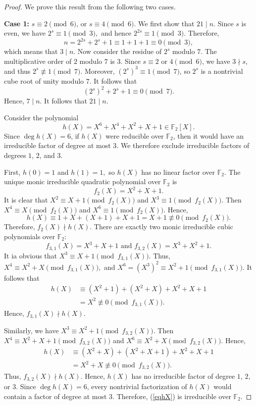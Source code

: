 \documentclass[12pt,draftcls,journal,onecolumn]{IEEEtran}
\begin{document}
\begin{proof}
We prove this result from the following two cases.

\noindent
\textbf{Case 1:} $s\equiv 2 \pmod 6$,
or
$s\equiv 4 \pmod 6$.  We first show that \(21\mid n\).
Since \(s\) is even, we have
$
2^s\equiv 1 \pmod 3,
$
and hence
$
2^{2s}\equiv 1 \pmod 3.
$
Therefore,
\[
n=2^{2s}+2^s+1\equiv 1+1+1\equiv 0 \pmod 3,
\]
which means that \(3\mid n\).
Now consider the residue of \(2^s\) modulo \(7\). The multiplicative order of \(2\) modulo \(7\) is \(3\). Since \(s\equiv 2\) or \(4\pmod 6\), we have \(3\nmid s\), and thus \(2^s\not\equiv 1\pmod 7\). Moreover, \((2^s)^3\equiv 1\pmod 7\), so \(2^s\) is a nontrivial cube root of unity modulo \(7\). It follows that
\[
(2^s)^2+2^s+1\equiv 0 \pmod 7.
\]
Hence, \(7\mid n\). It follows that
$
21\mid n.
$

Consider the polynomial
\begin{equation}\label{eqhX}
h(X)=X^6+X^4+X^2+X+1\in \mathbb F_2[X].
\end{equation}
Since \(\deg {h(X)}=6\), if \(h(X)\) were reducible over \(\mathbb F_2\), then it would have an irreducible factor of degree at most \(3\). We therefore exclude irreducible factors of degrees \(1\), \(2\), and \(3\).

First,
$h(0)=1$ and $h(1)=1,$
so \(h(X)\) has no linear factor over \(\mathbb F_2\).
The unique monic irreducible quadratic polynomial over \(\mathbb F_2\) is
$$
f_2(X)=X^2+X+1.
$$
It is clear that
$
X^2\equiv X+1 \pmod {f_2(X)}
$ and $
X^3\equiv1\pmod {f_2(X)}.
$
Then
$
X^4\equiv X \pmod {f_2(X)}
$ and
$X^6\equiv1 \pmod {f_2(X)}.
$
Hence,
$$
h(X)
\equiv
1+X+(X+1)+X+1
=
X+1
\not\equiv0
\pmod{f_2(X)}.
$$
Therefore, \(f_2(X)\nmid h(X)\).
There are exactly two monic irreducible cubic polynomials over \(\mathbb F_2\):
$$
f_{3,1}(X)=X^3+X+1\,\, \text{and}\,\,
f_{3,2}(X)=X^3+X^2+1.
$$
It ia obvious that
$
X^3\equiv X+1 \pmod {f_{3,1}(X)}.
$
Thus,
$
X^4\equiv X^2+X \pmod {f_{3,1}(X)},
$ and $
X^6=(X^3)^2\equiv X^2+1 \pmod {f_{3,1}(X)}.
$
It follows that
$$
\begin{aligned}
h(X)
&\equiv
(X^2+1)+(X^2+X)+X^2+X+1\\
&=X^2
\not\equiv0
\pmod{f_{3,1}(X)}.
\end{aligned}
$$
Hence, \(f_{3,1}(X)\nmid h(X)\).

Similarly, we have
$
X^3\equiv X^2+1 \pmod {f_{3,2}(X)}.
$
Then
$
X^4\equiv X^2+X+1 \pmod {f_{3,2}(X)}
$
and
$
X^6\equiv X^2+X \pmod {f_{3,2}(X)}.
$
Hence,
$$
\begin{aligned}
h(X)
&\equiv
(X^2+X)+(X^2+X+1)+X^2+X+1\\
&=X^2+X
\not\equiv0
\pmod{f_{3,2}(X)}.
\end{aligned}
$$
Thus, \(f_{3,2}(X)\nmid h(X)\). Hence, \(h(X)\) has no irreducible factor of degree \(1\), \(2\), or \(3\). Since \(\deg h(X)=6\), every nontrivial factorization of \(h(X)\) would contain a factor of degree at most \(3\). Therefore, (\ref{eqhX})
is irreducible over \(\mathbb F_2\).



\end{proof}
\end{document}
